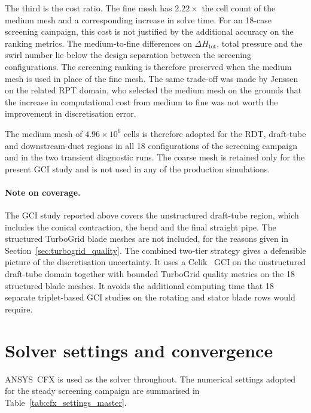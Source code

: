 The third is the cost ratio. The fine mesh has $2.22\times$ the cell count of the medium mesh and a corresponding increase in solve time. For an 18-case screening campaign, this cost is not justified by the additional accuracy on the ranking metrics. The medium-to-fine differences on $\Delta H_{\mathrm{tot}}$, total pressure and the swirl number lie below the design separation between the screening configurations. The screening ranking is therefore preserved when the medium mesh is used in place of the fine mesh. The same trade-off was made by Jenssen~\cite{Jenssen2020} on the related RPT domain, who selected the medium mesh on the grounds that the increase in computational cost from medium to fine was not worth the improvement in discretisation error.

The medium mesh of $4.96\times 10^6$ cells is therefore adopted for the RDT, draft-tube and downstream-duct regions in all 18 configurations of the screening campaign and in the two transient diagnostic runs. The coarse mesh is retained only for the present GCI study and is not used in any of the production simulations.

\paragraph{Note on coverage.}
The GCI study reported above covers the unstructured draft-tube region, which includes the conical contraction, the bend and the final straight pipe. The structured TurboGrid blade meshes are not included, for the reasons given in Section~\ref{sec:turbogrid_quality}. The combined two-tier strategy gives a defensible picture of the discretisation uncertainty. It uses a Celik~\cite{Celik2008} GCI on the unstructured draft-tube domain together with bounded TurboGrid quality metrics on the 18 structured blade meshes. It avoids the additional computing time that 18 separate triplet-based GCI studies on the rotating and stator blade rows would require.
 
\section{Solver settings and convergence}
\label{sec:methods_solver}
 
ANSYS~CFX is used as the solver throughout. The numerical settings adopted for the steady screening campaign are summarised in Table~\ref{tab:cfx_settings_master}.
 
